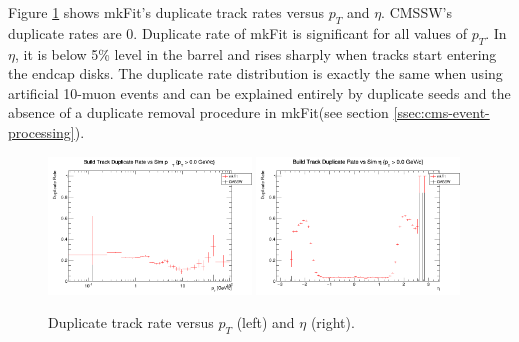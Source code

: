 \documentclass{webofc}
\def\mkfit{mkFit\xspace}
\def\GeVoc{\ensuremath{\,\rm{G}e\rm{V}/c}}
\def\twop{0.48\textwidth}
\def\postfigskip{\vskip-4mm}
\begin{document}


Figure \ref{fig:drates} shows \mkfit's duplicate track rates versus $p_T$ and
$\eta$. CMSSW's duplicate rates are 0. Duplicate rate of \mkfit is significant for all
values of $p_T$. In $\eta$, it is below 5\% level in the barrel and rises
sharply when tracks start entering the endcap disks. The duplicate rate 
distribution is exactly the same when using artificial 10-muon events 
and can be explained entirely by duplicate seeds and the absence of a duplicate
removal procedure in \mkfit (see section \ref{ssec:cms-event-processing}).

\begin{figure}[thb]
  \centering
  \includegraphics[width=\twop]{figs/phys/SKL-SP_CMSSW_TTbar_PU70_dr_pt_logx_build_pt0p0_SIMVAL.png}
  \hfill
  \includegraphics[width=\twop]{figs/phys/SKL-SP_CMSSW_TTbar_PU70_dr_eta_build_pt0p0_SIMVAL.png}
  \postfigskip

  \caption{Duplicate track rate versus $p_T$ (left) and $\eta$ (right).}
  \label{fig:drates}
\end{figure}
\end{document}
